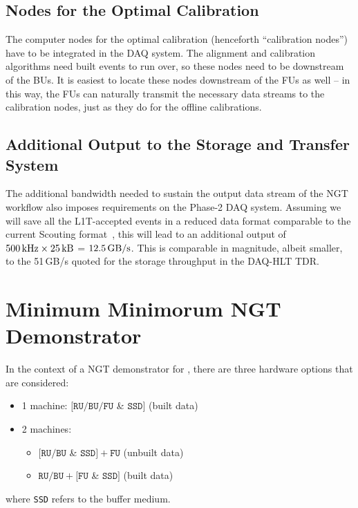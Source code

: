 \subsection{Nodes for the Optimal Calibration}

The computer nodes for the optimal calibration (henceforth ``calibration nodes'') have to be integrated in the DAQ system.
The alignment and calibration algorithms need built events to run over, so these nodes need to be downstream of the BUs.
It is easiest to locate these nodes downstream of the FUs as well --
in this way, the FUs can naturally transmit the necessary data streams to the calibration nodes, 
just as they do for the offline calibrations.

\subsection{Additional Output to the Storage and Transfer System}

The additional bandwidth needed to sustain the output data stream of the NGT workflow also imposes requirements on the Phase-2 DAQ system.
Assuming we will save all the L1T-accepted events in a reduced data format comparable to the current Scouting format~\cite{CMS:2024zhe},
this will lead to an additional output of $500\,\text{kHz} 
\times 25\,\text{kB}$ = $12.5\,\text{GB/s}$.
This is comparable in magnitude, albeit smaller, to the 51\,GB/s quoted for the storage throughput in the DAQ-HLT TDR.

\section{Minimum Minimorum NGT Demonstrator}

In the context of a NGT demonstrator for \Runthree, there are three hardware options that are considered:
\begin{itemize}
    \item 1 machine: $[\texttt{RU/BU}/\texttt{FU}$ \& $\texttt{SSD}]$ (built data)
    \item 2 machines: 
    \begin{itemize}
        \item $[\texttt{RU/BU}$ \& $\texttt{SSD}] + \texttt{FU}$ (unbuilt data)
        \item $\texttt{RU/BU} + [\texttt{FU}$ \& $\texttt{SSD}]$ (built data)
    \end{itemize}
\end{itemize}
where \texttt{SSD} refers to the buffer medium.

